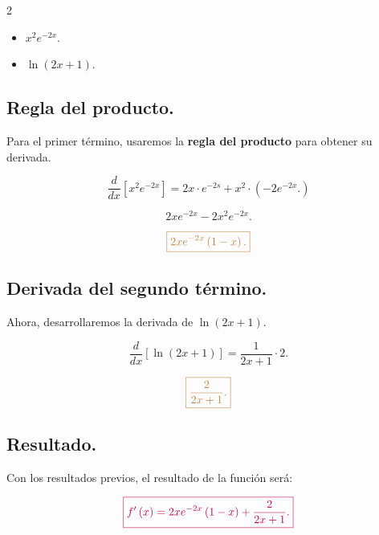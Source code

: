 \documentclass[a4paper,12pt]{article} %
\begin{document}
\begin{multicols}{2}
	\begin{itemize}
		\item \( x^2 e^{-2x}. \)
	\end{itemize}

	\begin{itemize}
		\item \( \ln(2x + 1). \)
	\end{itemize}
\end{multicols}

\subsection{Regla del producto.}

\begin{justify}
	Para el primer término, usaremos la \textbf{regla del producto} para obtener su derivada.
\end{justify}

\[ \frac{d}{dx}\left[ x^2 e^{-2x} \right] = 2x \cdot e^{-2s} + x^2 \cdot \left( -2 e^{-2x}.  \right) \]

\[ 2xe^{-2x} - 2x^2 e^{-2x}. \]

\[ \textcolor{brown}{\boxed{2xe^{-2x} \left( 1 - x \right).}} \]

\subsection{Derivada del segundo término.}

\begin{justify}
	Ahora, desarrollaremos la derivada de \( \ln(2x + 1) \).
\end{justify}

\[ \frac{d}{dx}\left[ \ln(2x + 1) \right] = \frac{1}{2x +1 } \cdot 2. \]

\[ \textcolor{brown}{\boxed{\frac{2}{2x + 1}.}} \]

\subsection{Resultado.}

\begin{justify}
	Con los resultados previos, el resultado de la función será:
\end{justify}

\[ \textcolor{purple}{\boxed{ f'\left( x \right) = 2x e^{-2x} \left( 1 - x \right) + \frac{2}{2x + 1}. }} \]
\end{document}
